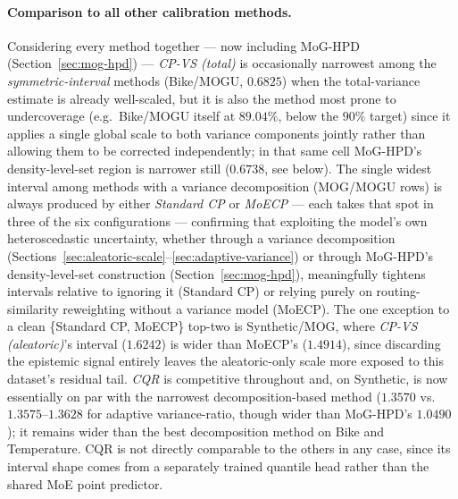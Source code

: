 \documentclass[11pt]{article}
\begin{document}
\paragraph{Comparison to all other calibration methods.} Considering every method together —
now including MoG-HPD (Section~\ref{sec:mog-hpd}) — \emph{CP-VS (total)} is occasionally narrowest
among the
\emph{symmetric-interval} methods (Bike/MOGU, $0.6825$) when the total-variance estimate is
already well-scaled, but it is also the method most prone to undercoverage (e.g.\ Bike/MOGU
itself at $89.04\%$, below the $90\%$ target) since it applies a single global scale to both
variance components jointly rather than allowing them to be corrected independently; in that
same cell MoG-HPD's density-level-set region is narrower still ($0.6738$, see below). The single
widest interval among methods with a variance decomposition (MOG/MOGU rows) is always produced
by either \emph{Standard CP} or \emph{MoECP} — each takes that spot in three of the six
configurations — confirming that exploiting the model's own heteroscedastic uncertainty, whether
through a variance decomposition (Sections~\ref{sec:aleatoric-scale}--\ref{sec:adaptive-variance})
or through MoG-HPD's density-level-set construction (Section~\ref{sec:mog-hpd}), meaningfully
tightens intervals relative to ignoring it (Standard CP) or relying purely on routing-similarity
reweighting without a variance model (MoECP). The one exception to a clean \{Standard CP, MoECP\}
top-two is Synthetic/MOG, where
\emph{CP-VS (aleatoric)}'s interval ($1.6242$) is wider than MoECP's ($1.4914$), since discarding
the epistemic signal entirely leaves the aleatoric-only scale more exposed to this dataset's
residual tail. \emph{CQR} is competitive throughout and, on Synthetic, is now essentially on par
with the narrowest decomposition-based method ($1.3570$ vs.\ $1.3575$–$1.3628$ for adaptive
variance-ratio, though wider than MoG-HPD's $1.0490$); it remains wider than the best
decomposition method on Bike and Temperature. CQR is not directly comparable to the others in
any case, since its interval shape comes from a separately trained quantile head rather than the
shared MoE point predictor.
\end{document}
